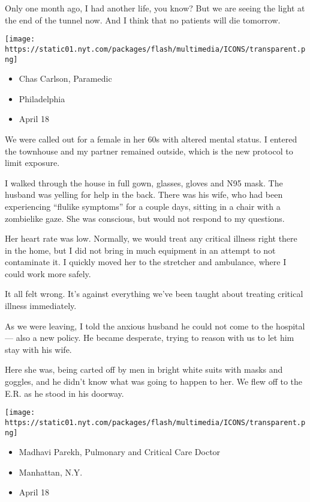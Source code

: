 Only one month ago, I had another life, you know? But we are seeing the
light at the end of the tunnel now. And I think that no patients will
die tomorrow.

\texttt{[image: https://static01.nyt.com/packages/flash/multimedia/ICONS/transparent.png]}

\begin{itemize}
\tightlist
\item
  Chas Carlson, Paramedic
\item
  Philadelphia
\item
  April 18
\end{itemize}

We were called out for a female in her 60s with altered mental status. I
entered the townhouse and my partner remained outside, which is the new
protocol to limit exposure.

I walked through the house in full gown, glasses, gloves and N95 mask.
The husband was yelling for help in the back. There was his wife, who
had been experiencing ``flulike symptoms'' for a couple days, sitting in
a chair with a zombielike gaze. She was conscious, but would not respond
to my questions.

Her heart rate was low. Normally, we would treat any critical illness
right there in the home, but I did not bring in much equipment in an
attempt to not contaminate it. I quickly moved her to the stretcher and
ambulance, where I could work more safely.

It all felt wrong. It's against everything we've been taught about
treating critical illness immediately.

As we were leaving, I told the anxious husband he could not come to the
hospital --- also a new policy. He became desperate, trying to reason
with us to let him stay with his wife.

Here she was, being carted off by men in bright white suits with masks
and goggles, and he didn't know what was going to happen to her. We flew
off to the E.R. as he stood in his doorway.

\texttt{[image: https://static01.nyt.com/packages/flash/multimedia/ICONS/transparent.png]}

\begin{itemize}
\tightlist
\item
  Madhavi Parekh, Pulmonary and Critical Care Doctor
\item
  Manhattan, N.Y.
\item
  April 18
\end{itemize}

